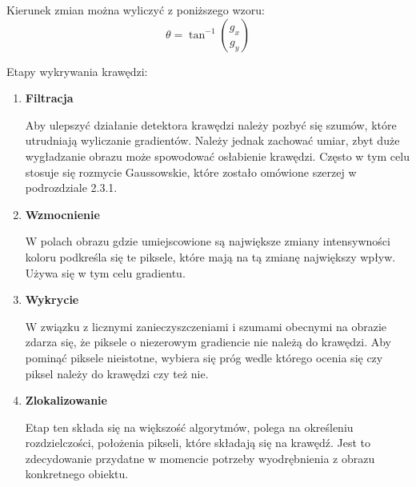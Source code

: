 \documentclass[eng,oneside]{mgr}
\begin{document}
\par Kierunek zmian można wyliczyć z poniższego wzoru:
\begin{equation}
\theta = \tan^{-1} \binom{g_x}{g_y}
\end{equation}
\newpage
\par Etapy wykrywania krawędzi:
\begin{enumerate}
\item \textbf{Filtracja}
\par Aby ulepszyć działanie detektora krawędzi należy pozbyć się szumów, które utrudniają wyliczanie gradientów. Należy jednak zachować umiar, zbyt duże wygładzanie obrazu może spowodować osłabienie krawędzi. Często w tym celu stosuje się rozmycie Gaussowskie, które zostało omówione szerzej w podrozdziale 2.3.1.
\item \textbf{Wzmocnienie}
\par W polach obrazu gdzie umiejscowione są największe zmiany intensywności koloru podkreśla się te piksele, które mają na tą zmianę największy wpływ. Używa się w tym celu gradientu.
\item \textbf{Wykrycie}
\par W związku z licznymi zanieczyszczeniami i szumami obecnymi na obrazie zdarza się, że piksele o niezerowym gradiencie nie należą do krawędzi. Aby pominąć piksele nieistotne, wybiera się próg wedle którego ocenia się czy piksel należy do krawędzi czy też nie.
\item \textbf{Zlokalizowanie}
\par Etap ten składa się na większość algorytmów, polega na określeniu rozdzielczości, położenia pikseli, które składają się na krawędź. Jest to zdecydowanie przydatne w momencie potrzeby wyodrębnienia z obrazu konkretnego obiektu\cite{etapy}.

\end{enumerate}
\end{document}
